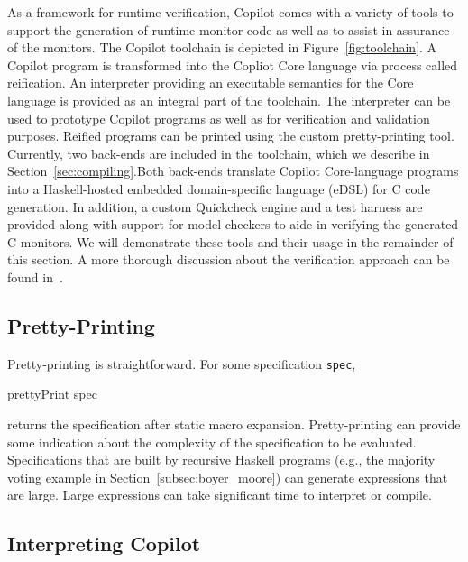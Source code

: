 As a framework for runtime verification, Copilot comes with a variety of tools
to support the generation of runtime monitor code as well as to assist in
assurance of the monitors. The Copilot toolchain is depicted in
Figure~\ref{fig:toolchain}.  A Copilot program is transformed into the Copliot
Core language via process called reification. An interpreter providing an
executable semantics for the Core language is provided as an integral part of
the toolchain. The interpreter can be used to prototype Copilot programs as well
as for verification and validation purposes. Reified programs can be printed
using the custom pretty-printing tool.  Currently, two back-ends are included in
the toolchain, which we describe in Section~\ref{sec:compiling}.Both back-ends
translate Copilot Core-language programs into a Haskell-hosted embedded
domain-specific language (eDSL) for C code
generation.  In addition, a custom Quickcheck engine and a test harness are
provided along with support for model checkers to aide in verifying the
generated C monitors.  We will demonstrate these tools and their usage in the
remainder of this section.  A more thorough discussion about the verification
approach can be found in~\cite{PikeWNG2012}.


\subsection{Pretty-Printing} \label{sec:pretty-printing}
Pretty-printing is straightforward.  For some specification {\tt spec},
%
\begin{code}
prettyPrint spec
\end{code}
%
\noindent
returns the specification after static macro expansion.  Pretty-printing can
provide some indication about the complexity of the specification to be
evaluated.  Specifications that are built by recursive Haskell programs (e.g.,
the majority voting example in Section~\ref{subsec:boyer_moore}) can generate
expressions that are large.  Large expressions can take significant
time to interpret or compile.

\subsection{Interpreting Copilot}

